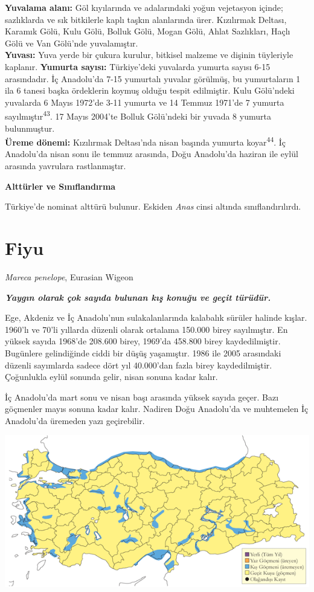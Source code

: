 \documentclass[
  letterpaper,
  DIV=11,
  numbers=noendperiod]{scrreprt}
\begin{document}
\textbf{Yuvalama alanı:} Göl kıyılarında ve adalarındaki yoğun
vejetasyon içinde; sazlıklarda ve sık bitkilerle kaplı taşkın
alanlarında ürer. Kızılırmak Deltası, Karamık Gölü, Kulu Gölü, Bolluk
Gölü, Mogan Gölü, Ahlat Sazlıkları, Haçlı Gölü ve Van Gölü'nde
yuvalamıştır.\\
\textbf{Yuvası:} Yuva yerde bir çukura kurulur, bitkisel malzeme ve
dişinin tüyleriyle kaplanır. \textbf{\hfill\break
Yumurta sayısı:} Türkiye'deki yuvalarda yumurta sayısı 6-15 arasındadır.
İç Anadolu'da 7-15 yumurtalı yuvalar görülmüş, bu yumurtaların 1 ila 6
tanesi başka ördeklerin koymuş olduğu tespit edilmiştir. Kulu Gölü'ndeki
yuvalarda 6 Mayıs 1972'de 3-11 yumurta ve 14 Temmuz 1971'de 7 yumurta
sayılmıştır\textsuperscript{43}. 17 Mayıs 2004'te Bolluk Gölü'ndeki bir
yuvada 8 yumurta bulunmuştur.\\
\textbf{Üreme dönemi:} Kızılırmak Deltası'nda nisan başında yumurta
koyar\textsuperscript{44}. İç Anadolu'da nisan sonu ile temmuz arasında,
Doğu Anadolu'da haziran ile eylül arasında yavrulara rastlanmıştır.

\textbf{Alttürler ve Sınıflandırma}

Türkiye'de nominat alttürü bulunur. Eskiden \emph{Anas} cinsi altında
sınıflandırılırdı.

\hypertarget{fiyu}{%
\section{Fiyu}\label{fiyu}}

\emph{Mareca penelope}, Eurasian Wigeon

\textbf{\emph{Yaygın olarak çok sayıda bulunan kış konuğu ve geçit
türüdür.}}

Ege, Akdeniz ve İç Anadolu'nun sulakalanlarında kalabalık sürüler
halinde kışlar. 1960'lı ve 70'li yıllarda düzenli olarak ortalama
150.000 birey sayılmıştır. En yüksek sayıda 1968'de 208.600 birey,
1969'da 458.800 birey kaydedilmiştir. Bugünlere gelindiğinde ciddi bir
düşüş yaşamıştır. 1986 ile 2005 arasındaki düzenli sayımlarda sadece
dört yıl 40.000'dan fazla birey kaydedilmiştir. Çoğunlukla eylül sonunda
gelir, nisan sonuna kadar kalır.

İç Anadolu'da mart sonu ve nisan başı arasında yüksek sayıda geçer. Bazı
göçmenler mayıs sonuna kadar kalır. Nadiren Doğu Anadolu'da ve
muhtemelen İç Anadolu'da üremeden yazı geçirebilir.

\includegraphics{images/harita_Page_015.png}
\end{document}

